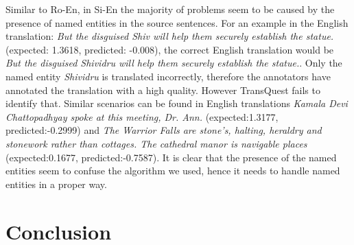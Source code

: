 Similar to Ro-En, in Si-En the majority of problems seem to be caused by the presence of named entities in the source sentences. For an example in the English translation: \emph{But the disguised Shiv will help them securely establish the statue.
} (expected: 1.3618, predicted: -0.008), the correct English translation would be \emph{But the disguised Shividru will help them securely establish the statue.}. Only the named entity \emph{Shividru} is translated incorrectly, therefore the annotators have annotated the translation with a high quality. However TransQuest fails to identify that. Similar scenarios can be found in English translations \emph{Kamala Devi Chattopadhyay spoke at this meeting, Dr. Ann.} (expected:1.3177, predicted:-0.2999) and \emph{The Warrior Falls are stone's, halting, heraldry and stonework rather than cottages. The cathedral manor is navigable places} (expected:0.1677, predicted:-0.7587). It is clear that the presence of the named entities seem to confuse the algorithm we used, hence it needs to handle named entities in a proper way.




\section{Conclusion}